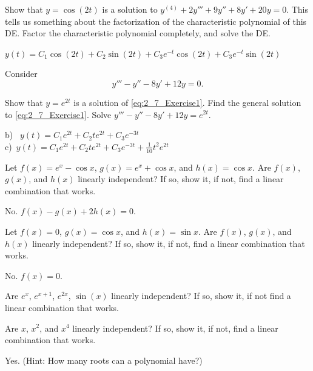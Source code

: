 \begin{exercise}
Show that $y=\cos(2t)$ is a solution to $y^{(4)}+2y'''+9y''+8y'+20y=0$. %
This tells us something about the factorization of the characteristic polynomial of this DE. Factor the characteristic polynomial completely, and solve the DE.
\end{exercise}
\comboSol{%
}
{%
$y(t) = C_1\cos(2t) + C_2\sin(2t) + C_3e^{-t}\cos(2t) + C_3e^{-t}\sin(2t)$
}

\begin{exercise}
Consider 
\begin{equation}
y'''-y''-8y'+12y=0. \label{eq:2_7_Exercise1}
\end{equation}
\begin{tasks}
\task Show that $y=e^{2t}$ is a solution of \eqref{eq:2_7_Exercise1}.
\task Find the general solution to \eqref{eq:2_7_Exercise1}.
\task Solve $y'''-y''-8y'+12y=e^{2t}$.
\end{tasks}
\end{exercise}
\comboSol{%
}
{%
b)~ $y(t) = C_1e^{2t} + C_2te^{2t} + C_3e^{-3t}$ \\
c)~$y(t) = C_1e^{2t} + C_2te^{2t} + C_3e^{-3t} + \frac{1}{10}t^2e^{2t}$
}

\begin{exercise}
Let
$f(x) = e^x - \cos x$, $g(x) = e^x + \cos x$, and $h(x) = \cos x$.
Are $f(x)$, $g(x)$, and $h(x)$
linearly independent?  If so, show
it, if not, find a linear combination that works.
\end{exercise}
\comboSol{%
}
{%
No. $f(x) - g(x) + 2h(x) = 0$.
}

\begin{exercise}
Let
$f(x) = 0$, $g(x) = \cos x$, and $h(x) = \sin x$.
Are $f(x)$, $g(x)$, and $h(x)$
linearly independent?  If so, show
it, if not, find a linear combination that works.
\end{exercise}
\comboSol{%
}
{%
No. $f(x) = 0$.
}

\begin{exercise}\ansMark%
Are $e^{x}$, $e^{x+1}$, $e^{2x}$, $\sin(x)$ linearly independent?
If so, show it, if not find a linear combination that works.
\end{exercise}

\begin{exercise}
Are $x$, $x^2$, and $x^4$
linearly independent?  If so, show
it, if not, find a linear combination that works.
\end{exercise}
\comboSol{%
}
{%
Yes. (Hint: How many roots can a polynomial have?)
}

